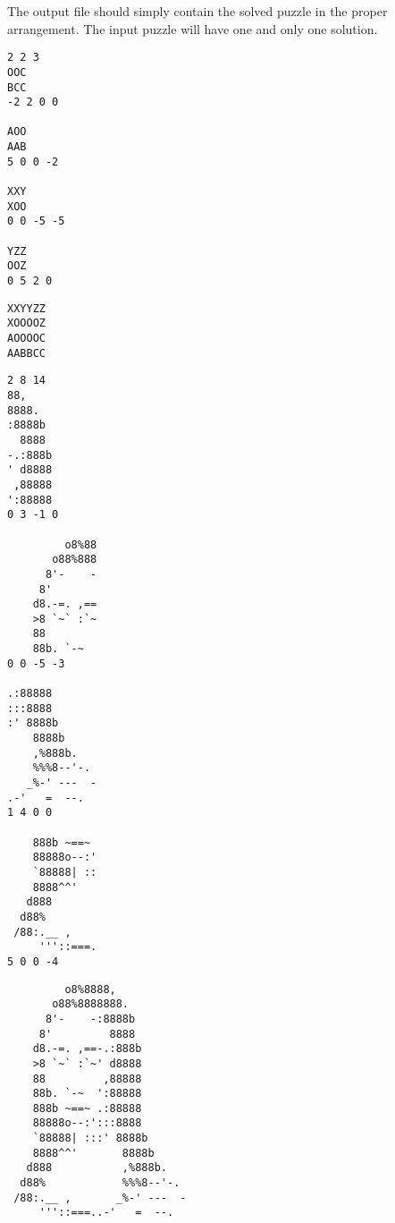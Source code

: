 The output file should simply contain the solved puzzle in the proper
arrangement. The input puzzle will have one and only one solution.

\newpage


{\small
\begin{verbatim}
2 2 3
OOC
BCC
-2 2 0 0

AOO
AAB
5 0 0 -2

XXY
XOO
0 0 -5 -5

YZZ
OOZ
0 5 2 0
\end{verbatim}
}

\bigskip
{}

{\small
\begin{verbatim}
XXYYZZ
XOOOOZ
AOOOOC
AABBCC
\end{verbatim}
}


{\small
\begin{verbatim}
2 8 14
88,           
8888.         
:8888b        
  8888        
-.:888b       
' d8888       
 ,88888       
':88888       
0 3 -1 0

         o8%88
       o88%888
      8'-    -
     8'       
    d8.-=. ,==
    >8 `~` :`~
    88        
    88b. `-~  
0 0 -5 -3

.:88888       
:::8888       
:' 8888b      
    8888b     
    ,%888b.   
    %%%8--'-. 
   _%-' ---  -
.-'   =  --.  
1 4 0 0

    888b ~==~ 
    88888o--:'
    `88888| ::
    8888^^'   
   d888       
  d88%        
 /88:.__ ,    
     '''::===.
5 0 0 -4
\end{verbatim}
}

\bigskip
{}

{\small
\begin{verbatim}
         o8%8888,           
       o88%8888888.         
      8'-    -:8888b        
     8'         8888        
    d8.-=. ,==-.:888b       
    >8 `~` :`~' d8888       
    88         ,88888       
    88b. `-~  ':88888       
    888b ~==~ .:88888       
    88888o--:':::8888       
    `88888| :::' 8888b      
    8888^^'       8888b     
   d888           ,%888b.   
  d88%            %%%8--'-. 
 /88:.__ ,       _%-' ---  -
     '''::===..-'   =  --.
\end{verbatim}
}


